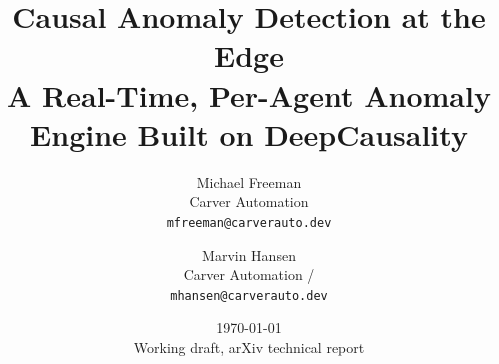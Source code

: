 \documentclass[11pt]{article}
\title{\textbf{Causal Anomaly Detection at the Edge}\\[2pt]
\large A Real-Time, Per-Agent Anomaly Engine Built on DeepCausality}
\author{
  Michael Freeman\\
  \small Carver Automation\\
  \small \texttt{mfreeman@carverauto.dev}
  \and
  Marvin Hansen\\
  \small Carver Automation / \dc\\
  \small \texttt{mhansen@carverauto.dev}
}
\date{\today\\[2pt]\small Working draft, arXiv technical report}
\begin{document}
\maketitle

\begin{abstract}

\end{abstract}















\end{document}
